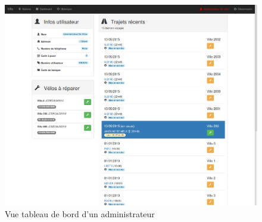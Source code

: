 \documentclass[a4paper,10pt]{article}
\begin{document}
\begin{figure}[H]
  \centering
  \includegraphics[scale=0.2]{Dashboard-admin.png}
  \caption{\label{fig:dashboard} Vue tableau de bord d'un administrateur}
\end{figure}
\end{document}
